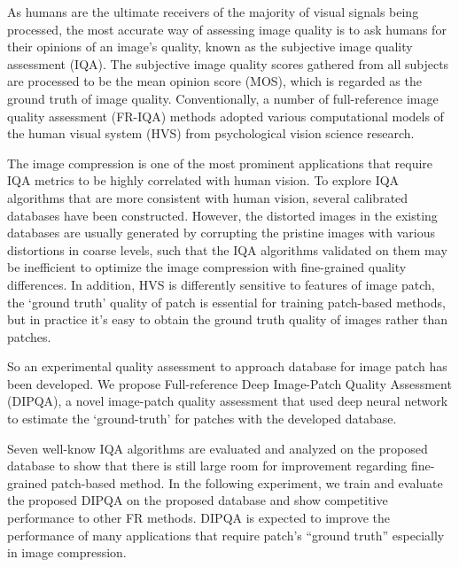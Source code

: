 \documentclass[a4paper, 13pt, oneside]{Thesis}
\begin{document}
As humans are the ultimate receivers of the majority of visual signals being processed, the most accurate way of assessing image quality is to ask humans for their opinions of an image’s quality, known as the subjective image quality assessment (IQA). The subjective image quality scores gathered from all subjects are processed to be the mean opinion score (MOS), which is regarded as the ground truth of image quality. Conventionally, a number of full-reference image quality assessment (FR-IQA) methods adopted various computational models of the human visual system (HVS) from psychological vision science research.

The image compression is one of the most
prominent applications that require IQA metrics to be highly
correlated with human vision. To explore IQA algorithms that are
more consistent with human vision, several calibrated databases
have been constructed. However, the distorted images in the existing databases are usually generated by corrupting the pristine
images with various distortions in coarse levels, such that the
IQA algorithms validated on them may be inefficient to optimize
the image compression with fine-grained quality
differences. In addition, HVS is differently sensitive to features of image patch, the \enquote*{ground
truth} quality of patch is essential for training patch-based methods, but in practice it’s easy to obtain the ground truth quality of images
rather than patches. 

So an experimental quality assessment to approach database for image patch has been developed. We propose Full-reference Deep Image-Patch Quality Assessment (DIPQA), a novel image-patch quality assessment that used deep neural network to estimate the \enquote*{ground-truth} for patches with the developed database.

Seven well-know IQA algorithms are evaluated and analyzed on the proposed database to show that there is still large room for improvement regarding fine-grained patch-based method. In the following experiment, we train and evaluate the proposed DIPQA on the proposed database and show competitive performance to other FR methods. DIPQA is expected to improve the performance of many applications that require patch's \enquote{ground truth} especially in image compression. 


%
\tableofcontents
\listoffigures
\listoftables
\end{document}
